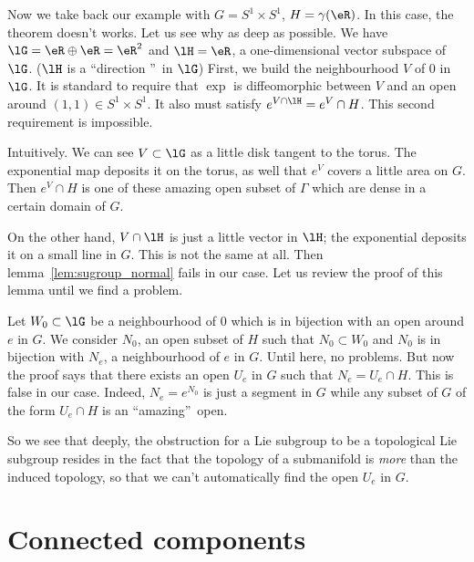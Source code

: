 Now we take back our example with $G=S^1\times S^1$, $H=\gamma(\eR)$. In this case, the theorem doesn't works. Let us see why as deep as possible. We have $\lG=\eR\oplus\eR=\eR^2$ and $\lH=\eR$, a one-dimensional vector subspace of $\lG$. ($\lH$ is a ``direction ''\ in $\lG$) First, we build the neighbourhood $V$ of $0$ in $\lG$. It is standard to require that $\exp$ is diffeomorphic between $V$ and an open around $(1,1)\in S^1\times S^1$. It also must satisfy $e^{V\cap\lH}=e^V\cap H$. This second requirement is impossible.

Intuitively. We can see $V\subset\lG$ as a little disk tangent to  the torus. The exponential map deposits it on the torus, as well that $e^V$ covers a little area on $G$. Then $e^V\cap H$ is one of these amazing open subset of $\Gamma$ which are dense in a certain domain of $G$.

On the other hand, $V\cap\lH$ is just a little vector in $\lH$; the exponential deposits it on a small line in $G$. This is not the same at all. Then lemma~\ref{lem:sugroup_normal} fails in our case. Let us review the proof of this lemma until we find a problem.

Let $W_0\subset\lG$  be a neighbourhood of $0$ which is in bijection with an open around $e$ in $G$. We consider $N_0$, an open subset of $H$ such that $N_0\subset W_0$ and $N_0$ is in bijection with $N_e$, a neighbourhood of $e$ in $G$. Until here, no problems. But now the proof says that there exists an open $U_e$ in $G$ such that $N_e=U_e\cap H$. This is false in our case. Indeed, $N_e=e^{N_0}$ is just a segment in $G$ while any subset of $G$ of the form $U_e\cap H$ is an ``amazing''\ open.

So we see that deeply, the obstruction for a Lie subgroup to be a topological Lie subgroup resides in the fact that the topology of a submanifold is \emph{more} than the induced topology, so that we can't automatically find the open $U_e$ in $G$.

\section{Connected components}

